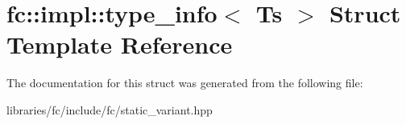 \hypertarget{structfc_1_1impl_1_1type__info}{}\section{fc\+:\+:impl\+:\+:type\+\_\+info$<$ Ts $>$ Struct Template Reference}
\label{structfc_1_1impl_1_1type__info}


The documentation for this struct was generated from the following file\+:\begin{DoxyCompactItemize}
\item 
libraries/fc/include/fc/static\+\_\+variant.\+hpp\end{DoxyCompactItemize}

